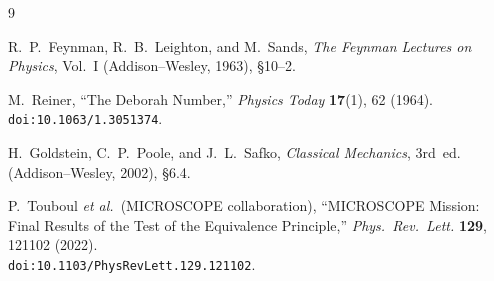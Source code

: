 \documentclass[12pt,a4paper]{article}
\theoremstyle{plain}
\theoremstyle{definition}
\theoremstyle{remark}
\begin{document}
\begin{thebibliography}{9}

R.~P.~Feynman, R.~B.~Leighton, and M.~Sands, \emph{The Feynman Lectures on Physics}, Vol.~I (Addison--Wesley, 1963), \S10--2.

M.~Reiner, ``The Deborah Number,'' \emph{Physics Today} \textbf{17}(1), 62 (1964). \\
\texttt{doi:10.1063/1.3051374}.

H.~Goldstein, C.~P.~Poole, and J.~L.~Safko, \emph{Classical Mechanics}, 3rd~ed. (Addison--Wesley, 2002), \S6.4.

P.~Touboul \emph{et al.}\ (MICROSCOPE collaboration), ``MICROSCOPE Mission: Final Results of the Test of the Equivalence Principle,'' \emph{Phys.\ Rev.\ Lett.} \textbf{129}, 121102 (2022). \\
\texttt{doi:10.1103/PhysRevLett.129.121102}.

\end{thebibliography}
\end{document}
